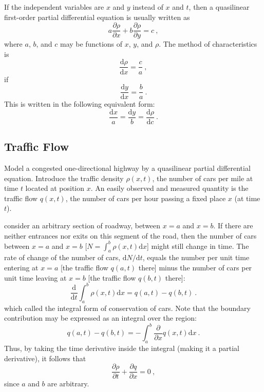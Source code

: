 \documentclass[12pt,a4paper]{article}
\newcommand{\dif}{\mathrm{d}}
\begin{document}
If the independent variables are $x$ and $y$ instead of $x$ and $t$, then a quasilinear first-order partial differential equation is usually written as
\begin{equation}
a \dfrac{\partial \rho }{\partial x} +b \dfrac{\partial \rho }{\partial y} = c ~,
\end{equation}
where $a$, $b$, and $c$ may be functions of $x$, $y$, and $\rho$. The method of characteristics is
\begin{equation}
\dfrac{\dif \rho}{\dif x} = \dfrac{c}{ a} ~, 
\end{equation}
if
\begin{equation}
\dfrac{\dif y}{\dif x} = \dfrac{b}{a} ~.
\end{equation}
This is written in the following equivalent form:
\begin{equation}
\dfrac{\dif x}{a} = \dfrac{\dif y}{b} = \dfrac{\dif \rho}{\dif c} ~.
\end{equation}


\subsection{Traffic Flow}
\cite{haberman2013applied} Model a congested one-directional highway by a quasilinear partial differential equation. Introduce the traffic density $\rho(x, t)$, the number of cars per mile at time $t$ located at position $x$. An easily observed and measured quantity is the traffic flow $q(x, t)$, the number of cars per hour passing a fixed place $x$ (at time $t$).

consider an arbitrary section of roadway, between $x = a$ and $x = b$. If there are neither entrances nor exits on this segment of the road, then the number of cars between $x = a$ and $x = b$ [$N = \int_a^b \rho(x,t) \dif x$] might still change in time. The rate of change of the number of cars, $\dif N/\dif t$, equals the number per unit time entering at $x = a$ [the traffic flow $q(a,t)$ there] minus the number of cars per unit time leaving at $x = b$ [the traffic flow $q(b, t)$ there]:
\begin{equation}
\dfrac{\dif }{\dif t} \int_a^b \rho(x,t) \dif x = q(a,t) -q(b,t) ~.
\end{equation}
which called the integral form of conservation of cars. Note that the boundary contribution may be expressed as an integral over the region:
\begin{equation}
q(a,t) -q(b,t)  = -\int_a^b \dfrac{\partial}{\partial x} q(x, t) \dif x ~.
\end{equation}
Thus, by taking the time derivative inside the integral (making it a partial derivative), it follows that
\begin{equation}
\dfrac{\partial \rho}{\partial t} +\dfrac{\partial q }{\partial x} = 0 ~,
\end{equation}
since $a$ and $b$ are arbitrary. 
\end{document}
